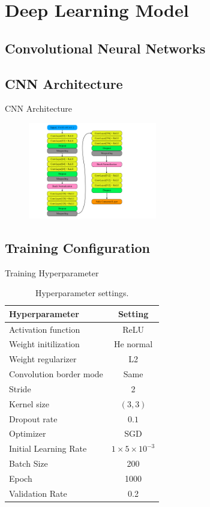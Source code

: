 \documentclass{beamer}
\begin{document}
\section{Deep Learning Model}
\subsection{Convolutional Neural Networks}
\subsection{CNN Architecture}
\begin{frame}{CNN Architecture}
\begin{figure}[!h]
        \centering
        \includegraphics[width=0.5\textwidth]{../report/Figures/cnn_arc.pdf}
\end{figure}
\end{frame}

\subsection{Training Configuration}
\begin{frame}{Training Hyperparameter}
\begin{table}[h!]
        \centering
        \begin{tabular}{ l | c  }
            Hyperparameter  & Setting \\ \hline
            Activation function & ReLU \\
            Weight initilization & He normal \\
            Weight regularizer &  L2 \\
            Convolution border mode  & Same \\
            Stride & 2 \\ 
            Kernel size & $(3, 3)$ \\
            Dropout rate & $0.1$ \\
            Optimizer & SGD \\
            Initial Learning Rate & $1\times 5\times10^{-3}$ \\
            Batch Size & 200 \\
            Epoch & 1000 \\
            Validation Rate & 0.2 \\
        \end{tabular}
        \caption{Hyperparameter settings.}
        \label{table:hyper}
\end{table}
\end{frame}
\end{document}
